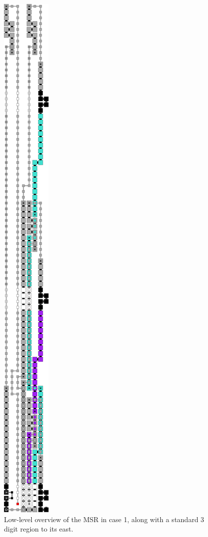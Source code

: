 \documentclass[10pt]{article}
\begin{document}
\begin{figure}
    \centering

    \includegraphics[width=.7in,valign=t]{1digit_msr_seed}

    \caption{\label{fig:1digit_msr_seed} Low-level overview of the MSR in case 1, along with a standard 3 digit region to its east. }

\end{figure}



\end{document}
